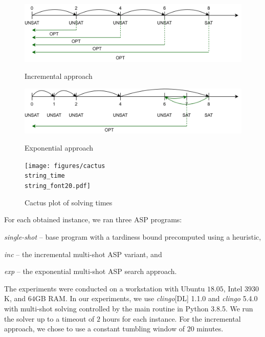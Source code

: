 \documentclass[submission,copyright,creativecommons]{eptcs}
\begin{document}
\begin{figure}
	\begin{minipage}[b]{.5\textwidth}
		\includegraphics[width=\linewidth]{figures/incremental.pdf}
		\caption{Incremental approach \label{fig:inc}}
			\smallskip %
			\bigskip
		\includegraphics[width=\linewidth]{figures/exponential.pdf}
		\caption{Exponential approach \label{fig:exp}}
	\end{minipage}%
	\begin{minipage}[b]{.5\textwidth}
		\texttt{[image: figures/cactus\\string\_time\\string\_font20.pdf]}
		\caption{Cactus plot of solving times \label{fig:cactus:time}}
	\end{minipage}
\end{figure}

For each obtained instance, we ran three ASP programs: 
\begin{enumerate*}[label=\emph{(\arabic*)}]	
	\item \emph{single-shot} -- base program with a tardiness bound precomputed using a heuristic,
	\item \emph{inc} -- the incremental multi-shot ASP variant, and 
	\item \emph{exp} -- the exponential multi-shot ASP search approach.
\end{enumerate*}
The experiments were conducted on a workstation with Ubuntu $18.05$, Intel  $3930$K, and $64$GB RAM. In our experiments, we use \emph{clingo}[DL] 1.1.0 and \emph{clingo} 5.4.0 with multi-shot solving controlled by the main routine in Python 3.8.5. We run the solver up to a timeout of $2$ hours for each instance. For the incremental approach, we chose to use a constant tumbling window of $20$ minutes.
\end{document}
